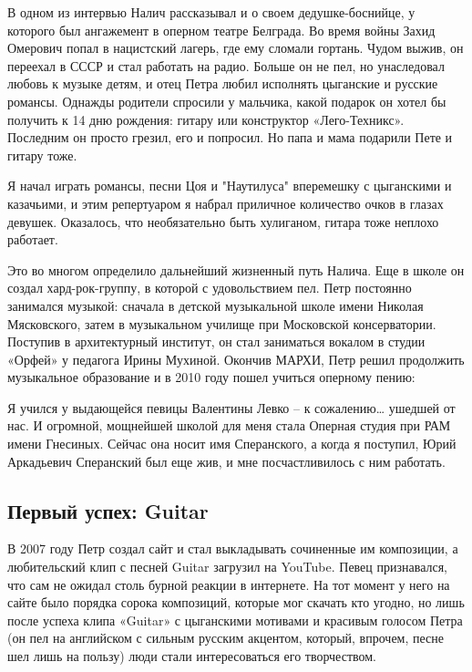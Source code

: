 В одном из интервью Налич рассказывал и о своем дедушке-боснийце, у которого был ангажемент в оперном театре Белграда. Во время войны Захид Омерович попал в нацистский лагерь, где ему сломали гортань. Чудом выжив, он переехал в СССР и стал работать на радио. Больше он не пел, но унаследовал любовь к музыке детям, и отец Петра любил исполнять цыганские и русские романсы. Однажды родители спросили у мальчика, какой подарок он хотел бы получить к 14 дню рождения: гитару или конструктор «Лего-Техникс». Последним он просто грезил, его и попросил. Но папа и мама подарили Пете и гитару тоже.

\begin{fancyquotes}
    Я начал играть романсы, песни Цоя и "Наутилуса" вперемешку с цыганскими и казачьими, и этим репертуаром я набрал приличное количество очков в глазах девушек. Оказалось, что необязательно быть хулиганом, гитара тоже неплохо работает.
\end{fancyquotes}

Это во многом определило дальнейший жизненный путь Налича. Еще в школе он создал хард-рок-группу, в которой с удовольствием пел. Петр постоянно занимался музыкой: сначала в детской музыкальной школе имени Николая Мясковского, затем в музыкальном училище при Московской консерватории. Поступив в архитектурный институт, он стал заниматься вокалом в студии «Орфей» у педагога Ирины Мухиной. Окончив МАРХИ, Петр решил продолжить музыкальное образование и в 2010 году пошел учиться оперному пению:

\begin{fancyquotes}
    Я учился у выдающейся певицы Валентины Левко – к сожалению… ушедшей от нас. И огромной, мощнейшей школой для меня стала Оперная студия при РАМ имени Гнесиных. Сейчас она носит имя Сперанского, а когда я поступил, Юрий Аркадьевич Сперанский был еще жив, и мне посчастливилось с ним работать.
\end{fancyquotes}


\subsection{Первый успех: Guitar}
В 2007 году Петр создал сайт и стал выкладывать сочиненные им композиции, а любительский клип с песней Guitar загрузил на YouTube. Певец признавался, что сам не ожидал столь бурной реакции в интернете. На тот момент у него на сайте было порядка сорока композиций, которые мог скачать кто угодно, но лишь после успеха клипа «Guitar» с цыганскими мотивами и красивым голосом Петра (он пел на английском с сильным русским акцентом, который, впрочем, песне шел лишь на пользу) люди стали интересоваться его творчеством.

